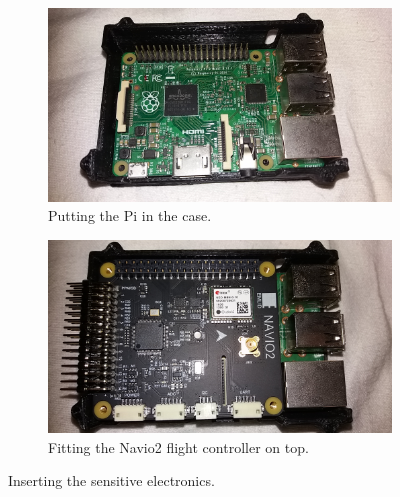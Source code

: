 \begin{figure}[H]
\begin{subfigure}{0.5\textwidth}
\centering
\includegraphics[scale=0.1]{images/drone-build-3dcase-pi.jpg}
\caption{Putting the Pi in the case.}
\label{fig:insertion_pi}
\end{subfigure}
\begin{subfigure}{0.5\textwidth}
\centering
\includegraphics[scale=0.1]{images/drone-build-3dcase-pi-navio.jpg}
\caption{Fitting the Navio2 flight controller on top.}
\label{fig:insertion_navio}
\end{subfigure}
\caption{Inserting the sensitive electronics.}
\label{fig:insertion}
\end{figure}

